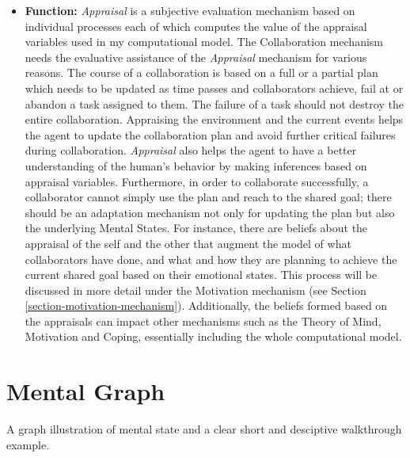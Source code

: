 \documentclass[letterpaper]{article}
\begin{document}
\begin{itemize}
  \item \textbf{Function:} \textit{Appraisal} is a subjective evaluation
  mechanism based on individual processes each of which computes the value of
  the appraisal variables used in my computational model. The Collaboration
  mechanism needs the evaluative assistance of the \textit{Appraisal} mechanism
  for various reasons. The course of a collaboration is based on a full or a
  partial plan which needs to be updated as time passes and collaborators
  achieve, fail at or abandon a task assigned to them. The failure of a task
  should not destroy the entire collaboration. Appraising the environment and
  the current events helps the agent to update the collaboration plan and avoid
  further critical failures during collaboration. \textit{Appraisal} also helps
  the agent to have a better understanding of the human's behavior by making
  inferences based on appraisal variables. Furthermore, in order to collaborate
  successfully, a collaborator cannot simply use the plan and reach to the
  shared goal; there should be an adaptation mechanism not only for updating the
  plan but also the underlying Mental States. For instance, there are beliefs
  about the appraisal of the self and the other that augment the model of what
  collaborators have done, and what and how they are planning to achieve the
  current shared goal based on their emotional states. This process will be
  discussed in more detail under the Motivation mechanism (see Section
  \ref{section-motivation-mechanism}). Additionally, the beliefs formed based on
  the appraisals can impact other mechanisms such as the Theory of Mind,
  Motivation and Coping, essentially including the whole computational model.
  
\end{itemize}

\section{Mental Graph}

A graph illustration of mental state and a clear short and desciptive
walkthrough example.
\end{document}
